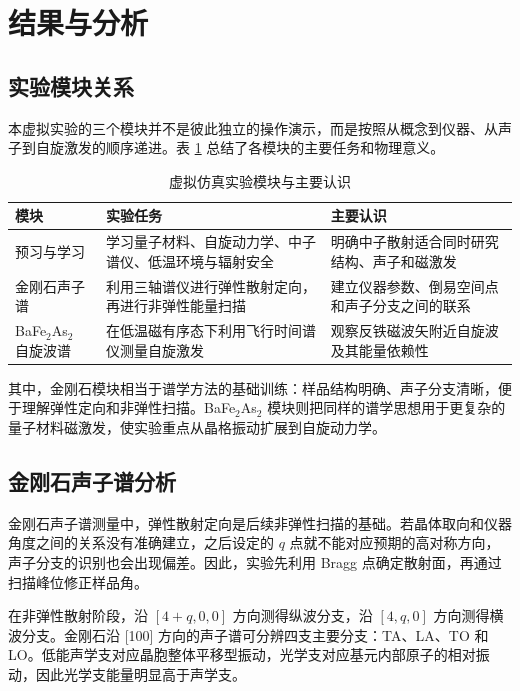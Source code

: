 \documentclass[a4paper]{ctexart}
\begin{document}
\section{结果与分析}

\subsection{实验模块关系}

本虚拟实验的三个模块并不是彼此独立的操作演示，而是按照从概念到仪器、从声子到自旋激发的顺序递进。表 \ref{tab:modules} 总结了各模块的主要任务和物理意义。

\begin{table}[H]
    \centering
    \caption{虚拟仿真实验模块与主要认识}
    \label{tab:modules}
    \begin{tabular}{p{}p{}p{}}
        \toprule
        模块 & 实验任务 & 主要认识 \\
        \midrule
        预习与学习 & 学习量子材料、自旋动力学、中子谱仪、低温环境与辐射安全 & 明确中子散射适合同时研究结构、声子和磁激发 \\
        金刚石声子谱 & 利用三轴谱仪进行弹性散射定向，再进行非弹性能量扫描 & 建立仪器参数、倒易空间点和声子分支之间的联系 \\
        BaFe$_2$As$_2$ 自旋波谱 & 在低温磁有序态下利用飞行时间谱仪测量自旋激发 & 观察反铁磁波矢附近自旋波及其能量依赖性 \\
        \bottomrule
    \end{tabular}
\end{table}

其中，金刚石模块相当于谱学方法的基础训练：样品结构明确、声子分支清晰，便于理解弹性定向和非弹性扫描。BaFe$_2$As$_2$ 模块则把同样的谱学思想用于更复杂的量子材料磁激发，使实验重点从晶格振动扩展到自旋动力学。

\subsection{金刚石声子谱分析}

金刚石声子谱测量中，弹性散射定向是后续非弹性扫描的基础。若晶体取向和仪器角度之间的关系没有准确建立，之后设定的 $q$ 点就不能对应预期的高对称方向，声子分支的识别也会出现偏差。因此，实验先利用 Bragg 点确定散射面，再通过扫描峰位修正样品角。

在非弹性散射阶段，沿 $[4+q,0,0]$ 方向测得纵波分支，沿 $[4,q,0]$ 方向测得横波分支。金刚石沿 [100] 方向的声子谱可分辨四支主要分支：TA、LA、TO 和 LO。低能声学支对应晶胞整体平移型振动，光学支对应基元内部原子的相对振动，因此光学支能量明显高于声学支。
\end{document}
